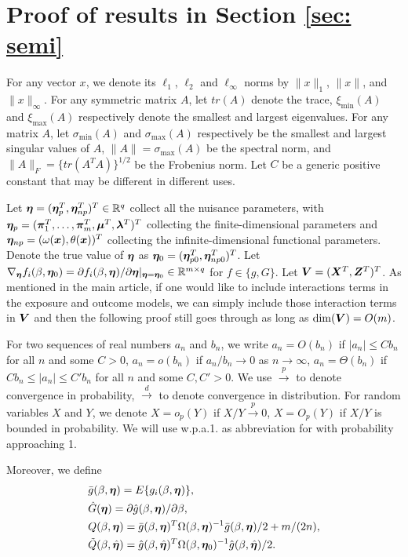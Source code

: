\documentclass[12pt]{article}
\begin{document}
{ 
\section{Proof of results in Section \ref{sec: semi}}
For any vector $ x $, we denote its $ \ell_1 $, $ \ell_2 $ and $ \ell_\infty $ norms  by $ \| x\|_1 $,  $ \|x\|$, and  $ \|x\|_\infty$. For any symmetric matrix $ A $, let  $tr (A)$ denote the trace, $\xi_{\min} (A)$ and $\xi_{\max} (A)$ respectively denote the smallest and largest eigenvalues.  For any matrix $ A $, let  $ \sigma_{\min} (A)$ and $ \sigma_{\max} (A)$ respectively be the smallest and largest singular values of $ A $,    $\|A\|= \sigma_{\max} (A) $ be the spectral norm, and $\|A\|_F= \{tr(A^T A)\}^{1/2}$ be the Frobenius norm.  Let $C$ be a generic positive constant that may be different in different uses. 




 Let $\bm \eta = (\bm \eta_{p}^T , \bm \eta_{np}^T)^T \in \mathbb{R}^q$ collect all the nuisance parameters, with $ \bm \eta_{p}= (\bm \pi_1^T,\dots, \bm \pi_m^T, \bm\mu^T,  \bm \lambda^T)^T $ collecting the finite-dimensional parameters  and $ \bm \eta_{np}= (\omega(\bm x), \theta(\bm x))^T $ collecting the infinite-dimensional functional parameters. Denote the true value of $ \bm \eta $ as $ \bm \eta_0=  (\bm \eta_{p0}^T , \bm \eta_{np0}^T)^T  $.  Let $\nabla_{\bm \eta} f_i(\beta, \bm \eta_0) = \partial f_i(\beta, \bm \eta)/\partial \bm \eta|_{\bm \eta=\bm \eta_0} \in \mathbb{R}^{m\times q} $ for $f\in \{g, G\}$.  Let $ \bm{V}= (\bm{X}^T, \bm{Z}^T)^T $. {As mentioned in the main article, if one would like to include interactions terms in the exposure and outcome models, we can simply include those interaction terms in $\bm{V}$ and then the following proof still goes through as long as ${\rm dim}(\bm{V})=O(m)$. 
 }

For two sequences of  real numbers $a_n$ and $b_n$, we write
$a_n = O(b_n)$ if $|a_n|\leq C b_n$ for all $n$  and some $C>0$, $a_n = o(b_n)$ if $a_n/b_n\rightarrow 0$ as $n\rightarrow\infty$, $a_n= \Theta(b_n) $ if $C b_n \leq |a_n|\leq C' b_n$ for all $n$ and some $C, C'>0$. We use $\xrightarrow{p}$ to denote convergence in probability, $\xrightarrow{d}$ to denote convergence in distribution. For random variables $X$ and $Y$, we denote $X= o_p(Y)$ if $X/Y\xrightarrow{p}0$, $X= O_p(Y)$ if $X/Y$ is bounded in probability. We will use  w.p.a.1. as abbreviation for with probability approaching 1. 

Moreover, we define
\begin{align*}
   &\bar g(\beta, \bm \eta) = E\{g_i(\beta, \bm \eta)\},\\
   & \hat G(\bm \eta) = \partial \hat g(\beta, \bm \eta) /\partial \beta,\\
   & Q(\beta, \bm \eta) = \bar g(\beta, \bm \eta)^T \Omega (\beta, \bm \eta)^{-1}\bar g(\beta, \bm \eta) /2+ m/(2n), \\
   &\tilde{Q}(\beta, \hat {\bm \eta}) = \hat g (\beta, \hat{\bm \eta})^T \Omega (\beta, \bm \eta_0)^{-1} \hat g (\beta, \hat{\bm \eta})/2.   
\end{align*}


}
\end{document}
